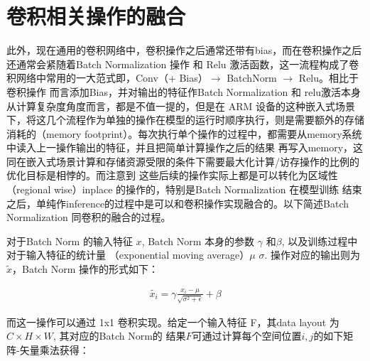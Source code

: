 \section{卷积相关操作的融合}

此外，现在通用的卷积网络中，卷积操作之后通常还带有bias，而在卷积操作之后还通常会紧随着Batch Normalization 操作
和 Relu 激活函数，这一流程构成了卷积网络中常用的一大范式即，Conv（+ Bias）$\to$ BatchNorm $\to$ Relu。相比于卷积操作
而言添加Bias，并对输出的特征作Batch Normalization 和 relu激活本身从计算复杂度角度而言，都是不值一提的，但是在
ARM 设备的这种嵌入式场景下，将这几个流程作为单独的操作在模型的运行时顺序执行，则是需要额外的存储消耗的（memory 
footprint）。每次执行单个操作的过程中，都需要从memory系统中读入上一操作输出的特征，并且把简单计算操作之后的结果
再写入memory，这同在嵌入式场景计算和存储资源受限的条件下需要最大化计算/访存操作的比例的优化目标是相悖的。而注意到
这些后续的操作实际上都是可以转化为区域性（regional wise）inplace 的操作的，特别是Batch Normalization 在模型训练
结束之后，单纯作inference的过程中是可以和卷积操作实现融合的。以下简述Batch Normalization 同卷积的融合的过程。

对于Batch Norm 的输入特征 $x$, Batch Norm 本身的参数 $\gamma$ 和$\beta$, 以及训练过程中对于输入特征的统计量
（exponential moving average）$\mu$ $\sigma$. 操作对应的输出则为 $\tilde{x}$，Batch Norm 操作的形式如下：

\begin{align}
\label{eq:bn}
\tilde{x_i} = \gamma \frac{x_i - \mu}{\sqrt{\sigma^2 + \epsilon}} + \beta
\end{align}

而这一操作可以通过 1x1 卷积实现。给定一个输入特征 F，其data layout 为 $C \times H \times W$, 其对应的Batch Norm的
结果$\hat{F}$可通过计算每个空间位置$i, j$的如下矩阵-矢量乘法获得：


